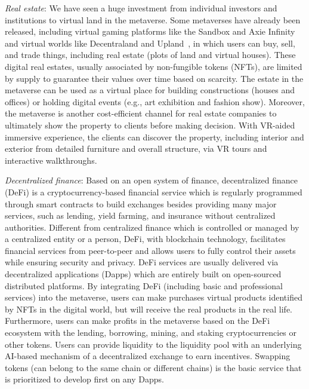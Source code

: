 \documentclass[journal]{IEEEtran}
\begin{document}
\textit{Real estate}:
We have seen a huge investment from individual investors and institutions to virtual land in the metaverse. Some metaverses have already been released, including virtual gaming platforms like the Sandbox and Axie Infinity and virtual worlds like Decentraland and Upland~\cite{debra2021investors}, in which users can buy, sell, and trade things, including real estate (plots of land and virtual houses). These digital real estates, usually associated by non-fungible tokens (NFTs), are limited by supply to guarantee their values over time based on scarcity. The estate in the metaverse can be used as a virtual place for building constructions (houses and offices) or holding digital events (e.g., art exhibition and fashion show). Moreover, the metaverse is another cost-efficient channel for real estate companies to ultimately show the property to clients before making decision. With VR-aided immersive experience, the clients can discover the property, including interior and exterior from detailed furniture and overall structure, via VR tours and interactive walkthroughs.

\textit{Decentralized finance}:
Based on an open system of finance, decentralized finance (DeFi) is a cryptocurrency-based financial service which is regularly programmed through smart contracts to build exchanges besides providing many major services, such as lending, yield farming, and insurance without centralized authorities. 
Different from centralized finance which is controlled or managed by a centralized entity or a person, DeFi, with blockchain technology, facilitates financial services from peer-to-peer and allows users to fully control their assets while ensuring security and privacy. 
DeFi services are usually delivered via decentralized applications (Dapps) which are entirely built on open-sourced distributed platforms.
By integrating DeFi (including basic and professional services) into the metaverse, users can make purchases virtual products identified by NFTs in the digital world, but will receive the real products in the real life. Furthermore, users can make profits in the metaverse based on the DeFi ecosystem with the lending, borrowing, mining, and staking cryptocurrencies or other tokens. Users can provide liquidity to the liquidity pool with an underlying AI-based mechanism of a decentralized exchange to earn incentives. Swapping tokens (can belong to the same chain or different chains) is the basic service that is prioritized to develop first on any Dapps.
\end{document}
